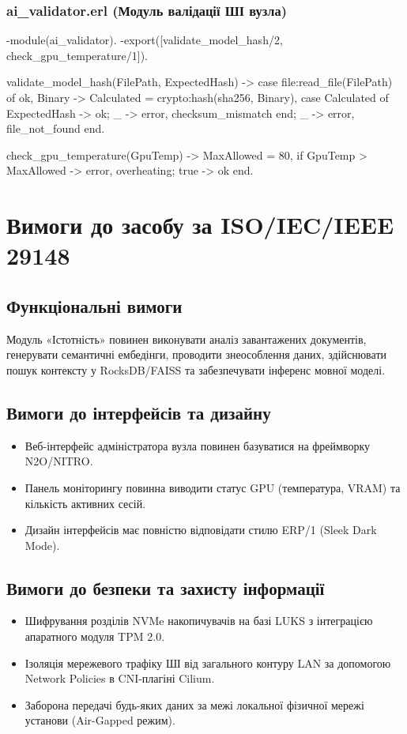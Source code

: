 \documentclass{article}
\let\originalfootnotesize\footnotesize
\let\oldverbatim\verbatim
\let\oldendverbatim\endverbatim
\renewenvironment{verbatim}{\originalfootnotesize\oldverbatim}{\oldendverbatim}
\begin{document}
\subsubsection{ai\_validator.erl (Модуль валідації ШІ вузла)}
\begin{verbatim}
-module(ai_validator).
-export([validate_model_hash/2, check_gpu_temperature/1]).

validate_model_hash(FilePath, ExpectedHash) ->
    case file:read_file(FilePath) of
        {ok, Binary} ->
            Calculated = crypto:hash(sha256, Binary),
            case Calculated of
                ExpectedHash -> ok;
                _ -> {error, checksum_mismatch}
            end;
        _ -> {error, file_not_found}
    end.

check_gpu_temperature(GpuTemp) ->
    MaxAllowed = 80,
    if
        GpuTemp > MaxAllowed -> {error, overheating};
        true -> ok
    end.
\end{verbatim}

\newpage
\section{Вимоги до засобу за ISO/IEC/IEEE 29148}

\subsection{Функціональні вимоги}
Модуль «Істотність» повинен виконувати аналіз завантажених документів, генерувати семантичні ембедінги, проводити знеособлення даних, здійснювати пошук контексту у RocksDB/FAISS та забезпечувати інференс мовної моделі.

\subsection{Вимоги до інтерфейсів та дизайну}
\begin{itemize}
    \item Веб-інтерфейс адміністратора вузла повинен базуватися на фреймворку N2O/NITRO.
    \item Панель моніторингу повинна виводити статус GPU (температура, VRAM) та кількість активних сесій.
    \item Дизайн інтерфейсів має повністю відповідати стилю ERP/1 (Sleek Dark Mode).
\end{itemize}

\subsection{Вимоги до безпеки та захисту інформації}
\begin{itemize}
    \item Шифрування розділів NVMe накопичувачів на базі LUKS з інтеграцією апаратного модуля TPM 2.0.
    \item Ізоляція мережевого трафіку ШІ від загального контуру LAN за допомогою Network Policies в CNI-плагіні Cilium.
    \item Заборона передачі будь-яких даних за межі локальної фізичної мережі установи (Air-Gapped режим).
\end{itemize}
\end{document}
